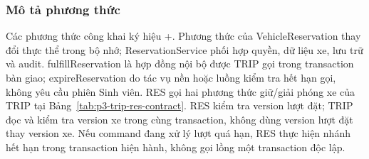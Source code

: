 \subsubsection{Mô tả phương thức}
Các phương thức công khai ký hiệu +. Phương thức của Vehicle\allowbreak Reservation thay đổi thực thể trong bộ nhớ; Reservation\allowbreak Service phối hợp quyền, dữ liệu xe, lưu trữ và audit. fulfill\allowbreak Reservation là hợp đồng nội bộ được TRIP gọi trong transaction bàn giao; expireReservation do tác vụ nền hoặc luồng kiểm tra hết hạn gọi, không yêu cầu phiên Sinh viên. RES gọi hai phương thức giữ/giải phóng xe của TRIP tại Bảng~\ref{tab:p3-trip-res-contract}. RES kiểm tra version lượt đặt; TRIP đọc và kiểm tra version xe trong cùng transaction, không dùng version lượt đặt thay version xe. Nếu command đang xử lý lượt quá hạn, RES thực hiện nhánh hết hạn trong transaction hiện hành, không gọi lồng một transaction độc lập.


